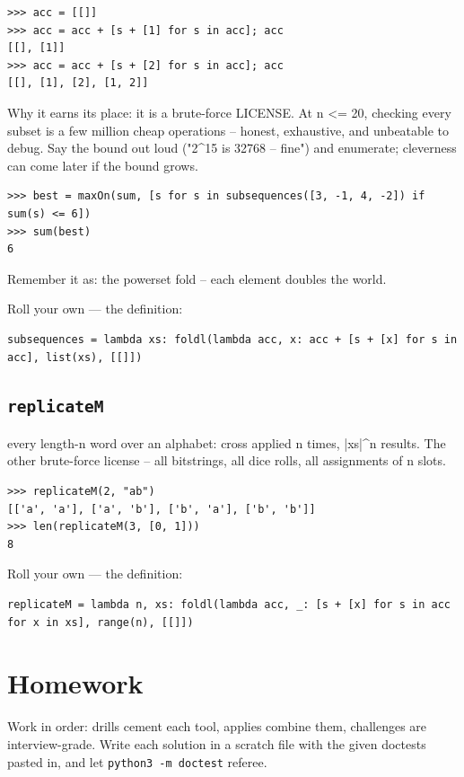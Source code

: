 \documentclass[10pt,letterpaper]{book}
\begin{document}
\begin{lstlisting}[style=ex]
>>> acc = [[]]
>>> acc = acc + [s + [1] for s in acc]; acc
[[], [1]]
>>> acc = acc + [s + [2] for s in acc]; acc
[[], [1], [2], [1, 2]]
\end{lstlisting}

Why it earns its place: it is a brute-force LICENSE. At n <= 20, checking every subset is a few million cheap operations -- honest, exhaustive, and unbeatable to debug. Say the bound out loud ("2\^{}15 is 32768 -- fine") and enumerate; cleverness can come later if the bound grows.

\begin{lstlisting}[style=ex]
>>> best = maxOn(sum, [s for s in subsequences([3, -1, 4, -2]) if sum(s) <= 6])
>>> sum(best)
6
\end{lstlisting}

Remember it as: the powerset fold -- each element doubles the world.


Roll your own --- the definition:

\begin{lstlisting}[style=ex]
subsequences = lambda xs: foldl(lambda acc, x: acc + [s + [x] for s in acc], list(xs), [[]])
\end{lstlisting}

\subsection{\texttt{replicateM}}\label{def:replicateM}
every length-n word over an alphabet: cross applied n times, |xs|\^{}n results. The other brute-force license -- all bitstrings, all dice rolls, all assignments of n slots.
\begin{lstlisting}[style=ex]
>>> replicateM(2, "ab")
[['a', 'a'], ['a', 'b'], ['b', 'a'], ['b', 'b']]
>>> len(replicateM(3, [0, 1]))
8
\end{lstlisting}

Roll your own --- the definition:

\begin{lstlisting}[style=ex]
replicateM = lambda n, xs: foldl(lambda acc, _: [s + [x] for s in acc for x in xs], range(n), [[]])
\end{lstlisting}
\section{Homework}
Work in order: drills cement each tool, applies combine them,
challenges are interview-grade. Write each solution in a scratch file with
the given doctests pasted in, and let \texttt{python3 -m doctest} referee.
\end{document}
